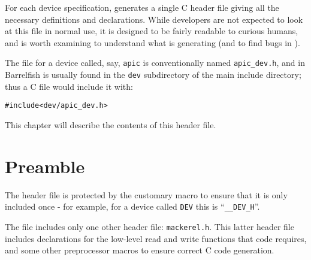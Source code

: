\documentclass[a4paper,11pt,twoside]{report}
\begin{document}
For each device specification, \Mac generates a single C header file
giving all the necessary definitions and declarations.   While
developers are not expected to look at this file in normal use, it is
designed to be fairly readable to curious humans, and is worth
examining to understand what \Mac is generating (and to find bugs in
\Mac). 

The file for a device called, say, \texttt{apic} is conventionally named
\texttt{apic\_dev.h}, and in Barrelfish is usually found in
the \texttt{dev} subdirectory of the main include directory; thus a C
file would include it with:

\begin{alltt}
#include <dev/apic\_dev.h>
\end{alltt}

This chapter will describe the contents of this header file. 

\section{Preamble}

The header file is protected by the customary macro to ensure that it
is only included once - for example, for a device called \texttt{DEV} this is
``\texttt{\_\_DEV\_H}''. 

The file includes only one other header file: \texttt{mackerel.h}.
This latter header file includes declarations for the low-level read
and write functions that \Mac code requires, and some other
preprocessor macros to ensure correct C code generation.   






\end{document}
